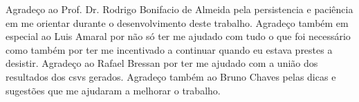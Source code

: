 
Agradeço ao Prof. Dr. Rodrigo Bonifacio de Almeida pela persistencia e paciência em me orientar 
durante o desenvolvimento deste trabalho.
Agradeço também em especial ao Luis Amaral por não só ter me ajudado com tudo o que foi necessário 
como também por ter me incentivado a continuar quando eu estava prestes a desistir.
Agradeço ao Rafael Bressan por ter me ajudado com a união dos resultados dos csvs gerados.
Agradeço também ao Bruno Chaves pelas dicas e sugestões que me ajudaram a melhorar o trabalho.